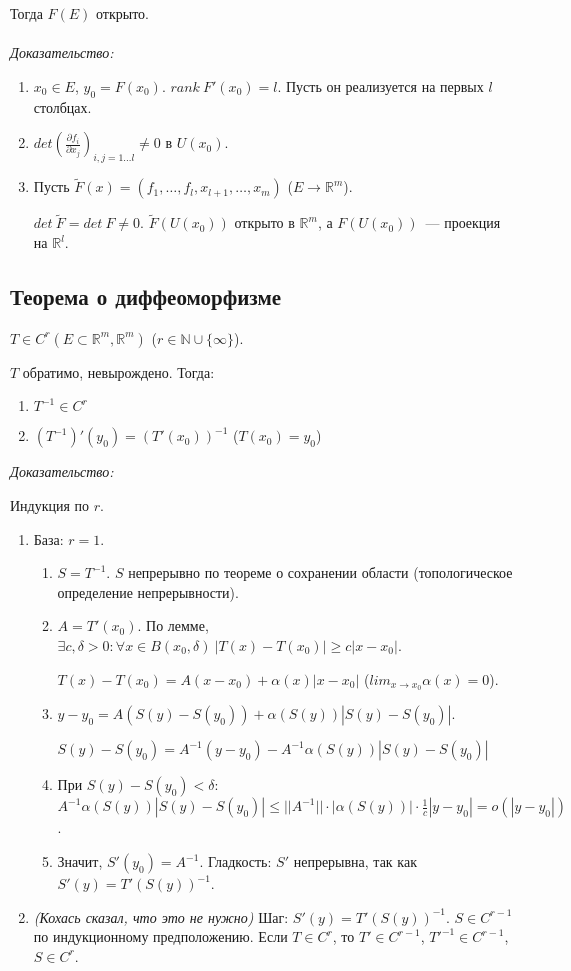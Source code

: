 \documentclass[paper=a4, fontsize=11pt]{article}
\begin{document}
Тогда $F(E)$ открыто.
\\\\
\emph{Доказательство:}
\begin{enumerate}
    \item $x_0 \in E$, $y_0 = F(x_0)$. $rank\ F'(x_0) = l$. Пусть он реализуется на первых $l$ столбцах.
    \item $det(\frac{\partial f_i}{\partial x_j})_{i,j=1\dots l} \neq 0$ в $U(x_0)$.
    \item Пусть $\widetilde{F}(x) = (f_1,\dots,f_l,x_{l+1},\dots,x_{m})$ ($E \rightarrow \mathds{R}^m$).

    $det\ \widetilde{F} = det\ F \neq 0$.
    $\widetilde{F}(U(x_0))$ открыто в $\mathds{R}^m$, а $F(U(x_0))$~--- проекция на $\mathds{R}^l$.
\end{enumerate}


\subsection{Теорема о диффеоморфизме}
$T \in C^r(E \subset \mathds{R}^m, \mathds{R}^m)$ ($r \in \mathds{N} \cup \{\infty\}$).

$T$ обратимо, невырождено. Тогда:
\begin{enumerate}
    \item $T^{-1} \in C^r$
    \item $(T^{-1})'(y_0) = (T'(x_0))^{-1}$ ($T(x_0)=y_0$)
\end{enumerate}

\emph{Доказательство:}

Индукция по $r$.
\begin{enumerate}
    \item База: $r=1$. 
    \begin{enumerate}
        \item $S=T^{-1}$. $S$ непрерывно по теореме о сохранении области (топологическое определение непрерывности).
        \item $A = T'(x_0)$. По лемме, $\exists c,\delta>0: \forall x \in B(x_0,\delta)\ |T(x)-T(x_0)| \geq c|x-x_0|$.

        $T(x)-T(x_0) = A(x-x_0) + \alpha(x)|x-x_0|$ ($lim_{x \to x_0}\alpha(x) = 0$).
        \item $y-y_0 = A(S(y)-S(y_0)) + \alpha(S(y))|S(y)-S(y_0)|$.
        
        $S(y) - S(y_0) = A^{-1}(y-y_0) - A^{-1}\alpha(S(y))|S(y)-S(y_0)|$
        \item При $S(y)-S(y_0) < \delta$:
        $A^{-1}\alpha(S(y))|S(y)-S(y_0)| \leq ||A^{-1}||\cdot|\alpha(S(y))|\cdot\frac{1}{c}|y-y_0| = o(|y-y_0|)$.
        \item Значит, $S'(y_0) = A^{-1}$. Гладкость: $S'$ непрерывна, так как $S'(y) = T'(S(y))^{-1}$.
    \end{enumerate}
    \item \emph{(Кохась сказал, что это не нужно)} Шаг: $S'(y) = T'(S(y))^{-1}$. $S \in C^{r-1}$ по индукционному предположению.
    Если $T \in C^r$, то $T' \in C^{r-1}$, $T'^{-1} \in C^{r-1}$, $S \in C^r$.
\end{enumerate}
\end{document}
